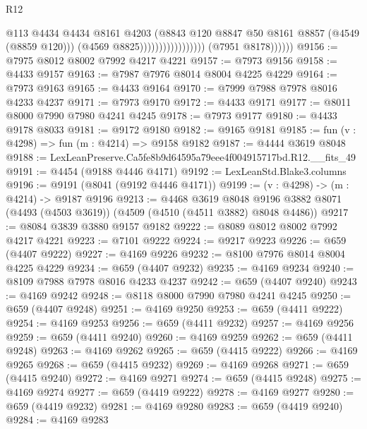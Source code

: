 \begin{lexlean}{R12}
\begin{coremodule}
                                              @113
                                              @4434
                                              @4434
                                              @8161
                                              @4203
                                              (@8843
                                                @120
                                                @8847
                                                @50
                                                @8161
                                                @8857
                                                (@4549 (@8859 @120)))
                                              (@4569 @8825)))))))))))))))))
              (@7951 @8178))))))
@9156 := @7975 @8012 @8002 @7992 @4217 @4221
@9157 := @7973 @9156
@9158 := @4433 @9157
@9163 := @7987 @7976 @8014 @8004 @4225 @4229
@9164 := @7973 @9163
@9165 := @4433 @9164
@9170 := @7999 @7988 @7978 @8016 @4233 @4237
@9171 := @7973 @9170
@9172 := @4433 @9171
@9177 := @8011 @8000 @7990 @7980 @4241 @4245
@9178 := @7973 @9177
@9180 := @4433 @9178 @8033
@9181 := @9172 @9180
@9182 := @9165 @9181
@9185 := fun (v : @4298) => fun (m : @4214) => @9158 @9182
@9187 := @4444 @3619 @8048
@9188 := LexLeanPreserve.Ca5fe8b9d64595a79eee4f004915717bd.R12.__fits_49
@9191 := @4454 (@9188 @4446 @4171)
@9192 := LexLeanStd.Blake3.columns
@9196 := @9191 (@8041 (@9192 @4446 @4171))
@9199 := (v : @4298) -> (m : @4214) -> @9187 @9196
@9213 := @4468
    @3619
    @8048
    @9196
    @3882
    @8071
    (@4493 (@4503 @3619))
    (@4509 (@4510 (@4511 @3882) @8048 @4486))
@9217 := @8084 @3839 @3880 @9157 @9182
@9222 := @8089 @8012 @8002 @7992 @4217 @4221
@9223 := @7101 @9222
@9224 := @9217 @9223
@9226 := @659 (@4407 @9222)
@9227 := @4169 @9226
@9232 := @8100 @7976 @8014 @8004 @4225 @4229
@9234 := @659 (@4407 @9232)
@9235 := @4169 @9234
@9240 := @8109 @7988 @7978 @8016 @4233 @4237
@9242 := @659 (@4407 @9240)
@9243 := @4169 @9242
@9248 := @8118 @8000 @7990 @7980 @4241 @4245
@9250 := @659 (@4407 @9248)
@9251 := @4169 @9250
@9253 := @659 (@4411 @9222)
@9254 := @4169 @9253
@9256 := @659 (@4411 @9232)
@9257 := @4169 @9256
@9259 := @659 (@4411 @9240)
@9260 := @4169 @9259
@9262 := @659 (@4411 @9248)
@9263 := @4169 @9262
@9265 := @659 (@4415 @9222)
@9266 := @4169 @9265
@9268 := @659 (@4415 @9232)
@9269 := @4169 @9268
@9271 := @659 (@4415 @9240)
@9272 := @4169 @9271
@9274 := @659 (@4415 @9248)
@9275 := @4169 @9274
@9277 := @659 (@4419 @9222)
@9278 := @4169 @9277
@9280 := @659 (@4419 @9232)
@9281 := @4169 @9280
@9283 := @659 (@4419 @9240)
@9284 := @4169 @9283

\end{coremodule}
\end{lexlean}
